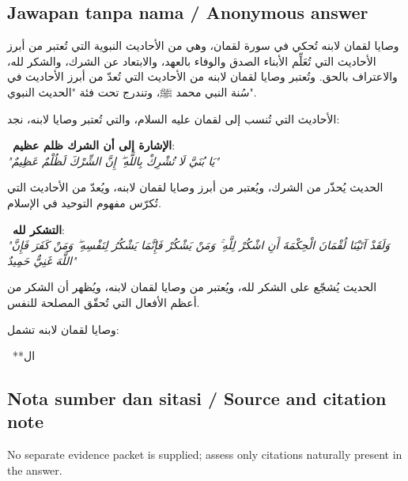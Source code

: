 \documentclass[11pt,a4paper]{article}
\newcommand{\ar}[1]{{\arabicfont #1}}
\begin{document}
\subsection*{Jawapan tanpa nama / Anonymous answer}
\ar{وصايا} \ar{لقمان} \ar{لابنه} \ar{تُحكي} \ar{في} \ar{سورة} \ar{لقمان،} \ar{وهي} \ar{من} \ar{الأحاديث} \ar{النبوية} \ar{التي} \ar{تُعتبر} \ar{من} \ar{أبرز} \ar{الأحاديث} \ar{التي} \ar{تُعَلِّم} \ar{الأبناء} \ar{الصدق} \ar{والوفاء} \ar{بالعهد،} \ar{والابتعاد} \ar{عن} \ar{الشرك،} \ar{والشكر} \ar{لله،} \ar{والاعتراف} \ar{بالحق}. \ar{وتُعتبر} \ar{وصايا} \ar{لقمان} \ar{لابنه} \ar{من} \ar{الأحاديث} \ar{التي} \ar{تُعدّ} \ar{من} \ar{أبرز} \ar{الأحاديث} \ar{في} \ar{سُنة} \ar{النبي} \ar{محمد} \ar{ﷺ،} \ar{وتندرج} \ar{تحت} \ar{فئة} "\ar{الحديث} \ar{النبوي}".\par\medskip \ar{من} \ar{الأحاديث} \ar{التي} \ar{تُنسب} \ar{إلى} \ar{لقمان} \ar{عليه} \ar{السلام،} \ar{والتي} \ar{تُعتبر} \ar{وصايا} \ar{لابنه،} \ar{نجد}:\par\medskip \textbullet\ \textbf{\ar{الإشارة} \ar{إلى} \ar{أن} \ar{الشرك} \ar{ظلم} \ar{عظيم}}:\\ \emph{"\ar{يَا} \ar{بُنَيَّ} \ar{لَا} \ar{تُشْرِكْ} \ar{بِاللَّهِ} \ar{ۖ} \ar{إِنَّ} \ar{الشِّرْكَ} \ar{لَظُلْمٌ} \ar{عَظِيمٌ}"}\par\medskip \ar{هذا} \ar{الحديث} \ar{يُحذّر} \ar{من} \ar{الشرك،} \ar{ويُعتبر} \ar{من} \ar{أبرز} \ar{وصايا} \ar{لقمان} \ar{لابنه،} \ar{ويُعدّ} \ar{من} \ar{الأحاديث} \ar{التي} \ar{تُكرّس} \ar{مفهوم} \ar{التوحيد} \ar{في} \ar{الإسلام}.\par\medskip \textbullet\ \textbf{\ar{التشكر} \ar{لله}}:\\ \emph{"\ar{وَلَقَدْ} \ar{آتَيْنَا} \ar{لُقْمَانَ} \ar{الْحِكْمَةَ} \ar{أَنِ} \ar{اشْكُرْ} \ar{لِلَّهِ} \ar{ۚ} \ar{وَمَنْ} \ar{يَشْكُرْ} \ar{فَإِنَّمَا} \ar{يَشْكُرُ} \ar{لِنَفْسِهِ} \ar{ۖ} \ar{وَمَنْ} \ar{كَفَرَ} \ar{فَإِنَّ} \ar{اللَّهَ} \ar{غَنِيٌّ} \ar{حَمِيدٌ}"}\par\medskip \ar{هذا} \ar{الحديث} \ar{يُشجّع} \ar{على} \ar{الشكر} \ar{لله،} \ar{ويُعتبر} \ar{من} \ar{وصايا} \ar{لقمان} \ar{لابنه،} \ar{ويُظهر} \ar{أن} \ar{الشكر} \ar{من} \ar{أعظم} \ar{الأفعال} \ar{التي} \ar{تُحقّق} \ar{المصلحة} \ar{للنفس}.\par\medskip \ar{إذن،} \ar{وصايا} \ar{لقمان} \ar{لابنه} \ar{تشمل}:\par\medskip \textbullet\ **\ar{ال}

\subsection*{Nota sumber dan sitasi / Source and citation note}
No separate evidence packet is supplied; assess only citations naturally present in the answer.
\end{document}
